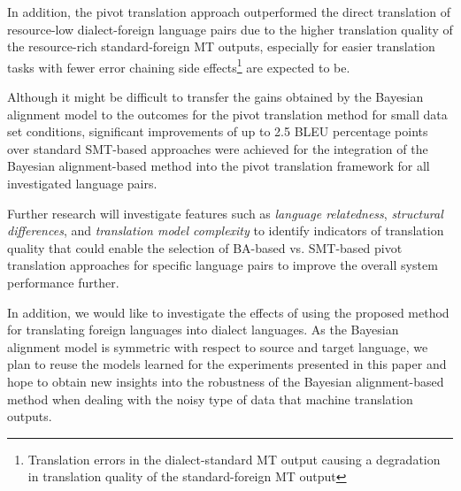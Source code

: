\documentclass[english]{jnlp_1.4}
\begin{document}
In addition, the pivot translation approach outperformed the direct translation of resource-low dialect-foreign language pairs due to the higher translation quality
of the resource-rich standard-foreign MT outputs, especially for easier translation tasks with fewer error chaining side effects\footnote{Translation errors in the dialect-standard MT output causing a degradation in translation quality of the standard-foreign MT output}
are expected to be.

Although it might be difficult to transfer the gains obtained by the Bayesian alignment model to the outcomes for the pivot translation method
for small data set conditions, significant improvements of up to 2.5 BLEU percentage points over standard SMT-based approaches were achieved 
for the integration of the Bayesian alignment-based method into the pivot translation framework for all investigated language pairs.

Further research will investigate features such as {\em language relatedness}, {\em structural differences},
and {\em translation model complexity} to identify indicators of translation quality that could enable the selection
of BA-based vs. SMT-based pivot translation approaches for specific language pairs to improve the overall system performance further.

In addition, we would like to investigate the effects of using the proposed method for translating foreign languages
into dialect languages. As the Bayesian alignment model is symmetric with respect to source and target language,
we plan to reuse the models learned for the experiments presented in this paper and hope to obtain new insights into
the robustness of the Bayesian alignment-based method when dealing with the noisy type of data that machine translation outputs.
\end{document}
